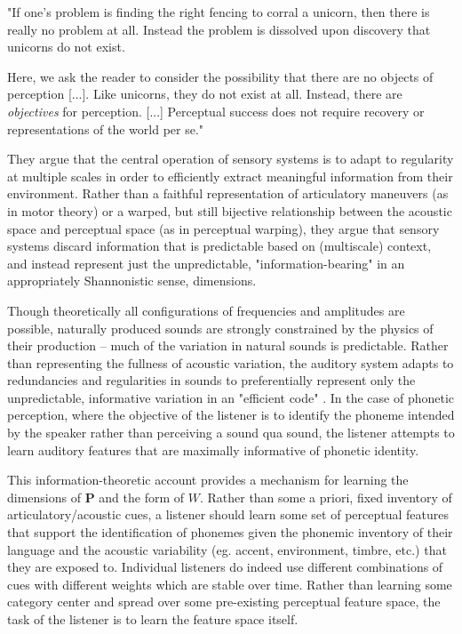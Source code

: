 \begin{leftbar}
"If one's problem is finding the right fencing to corral a unicorn, then there is really no problem at all. Instead the problem is dissolved upon discovery that unicorns do not exist.

Here, we ask the reader to consider the possibility that there are no objects of perception [...]. Like unicorns, they do not exist at all. Instead, there are \textit{objectives} for perception. [...] Perceptual success does not require recovery or representations of the world per se." \citep{kluenderLongstandingProblemsSpeech2019}
\end{leftbar}

They argue that the central operation of sensory systems is to adapt to regularity at multiple scales in order to efficiently extract meaningful information from their environment. Rather than a faithful representation of articulatory maneuvers (as in motor theory) or a warped, but still bijective relationship between the acoustic space and perceptual space (as in perceptual warping), they argue that sensory systems discard information that is predictable based on (multiscale) context, and instead represent just the unpredictable, "information-bearing" in an appropriately Shannonistic sense, dimensions. 

Though theoretically all configurations of frequencies and amplitudes are possible, naturally produced sounds are strongly constrained by the physics of their production -- much of the variation in natural sounds is predictable. Rather than representing the fullness of acoustic variation, the auditory system adapts to redundancies and regularities in sounds to preferentially represent only the unpredictable, informative variation in an "efficient code" \citep{smithEfficientAuditoryCoding2006a,Geffen2011}. In the case of phonetic perception, where the objective of the listener is to identify the phoneme intended by the speaker rather than perceiving a sound qua sound, the listener attempts to learn auditory features that are maximally informative of phonetic identity\citep{kiefteAbsorptionReliableSpectral2008,liuOptimalFeaturesAuditory2019,kluenderLongstandingProblemsSpeech2019,kluenderPerceptionVowelSounds2013}.

This information-theoretic account provides a mechanism for learning the dimensions of $\mathbf{P}$ and the form of $W$. Rather than some a priori, fixed inventory of articulatory/acoustic cues, a listener should learn some set of perceptual features that support the identification of phonemes given the phonemic inventory of their language and the acoustic variability (eg. accent, environment, timbre, etc.) that they are exposed to. Individual listeners do indeed use different combinations of cues with different weights\citep{iversonInfluencesPhoneticIdentification1996} which are stable over time\citep{souzaReliabilityRepeatabilitySpeech2018}. Rather than learning some category center and spread over some pre-existing perceptual feature space, the task of the listener is to learn the feature space itself. 

